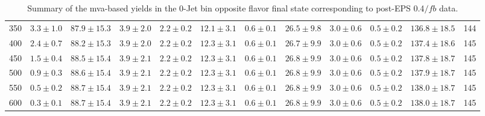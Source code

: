 \begin{table}
{\begin{center}
\begin{tabular}{l c c c c c c c c c c c }
350 & $3.3\pm1.0$ & $87.9\pm15.3$ & $3.9\pm2.0$ & $2.2\pm0.2$ & $12.1\pm3.1$ & $0.6\pm0.1$ & $26.5\pm9.8$ & $3.0\pm0.6$ & $0.5\pm0.2$ & $136.8\pm18.5$ & 144 \\
400 & $2.4\pm0.7$ & $88.2\pm15.3$ & $3.9\pm2.0$ & $2.2\pm0.2$ & $12.3\pm3.1$ & $0.6\pm0.1$ & $26.7\pm9.9$ & $3.0\pm0.6$ & $0.5\pm0.2$ & $137.4\pm18.6$ & 145 \\
450 & $1.5\pm0.4$ & $88.5\pm15.4$ & $3.9\pm2.1$ & $2.2\pm0.2$ & $12.3\pm3.1$ & $0.6\pm0.1$ & $26.8\pm9.9$ & $3.0\pm0.6$ & $0.5\pm0.2$ & $137.8\pm18.7$ & 145 \\
500 & $0.9\pm0.3$ & $88.6\pm15.4$ & $3.9\pm2.1$ & $2.2\pm0.2$ & $12.3\pm3.1$ & $0.6\pm0.1$ & $26.8\pm9.9$ & $3.0\pm0.6$ & $0.5\pm0.2$ & $137.9\pm18.7$ & 145 \\
550 & $0.5\pm0.2$ & $88.7\pm15.4$ & $3.9\pm2.1$ & $2.2\pm0.2$ & $12.3\pm3.1$ & $0.6\pm0.1$ & $26.8\pm9.9$ & $3.0\pm0.6$ & $0.5\pm0.2$ & $138.0\pm18.7$ & 145 \\
600 & $0.3\pm0.1$ & $88.7\pm15.4$ & $3.9\pm2.1$ & $2.2\pm0.2$ & $12.3\pm3.1$ & $0.6\pm0.1$ & $26.8\pm9.9$ & $3.0\pm0.6$ & $0.5\pm0.2$ & $138.0\pm18.7$ & 145 \\
\hline
\end{tabular}
\end{center}
}
\caption{Summary of the mva-based yields in the 0-Jet bin opposite flavor final state corresponding to post-EPS 0.4$/fb$ data.}
\end{table}
